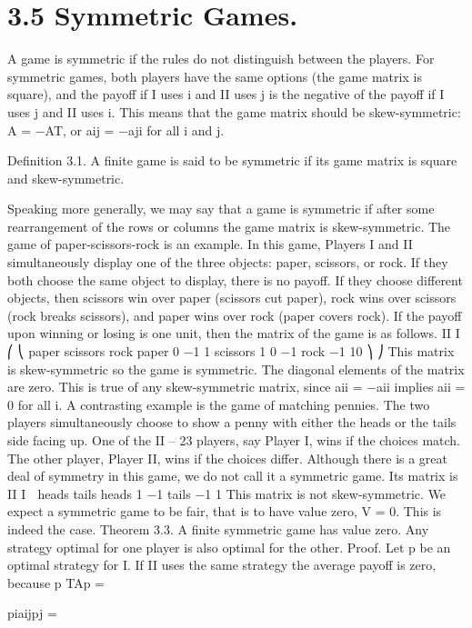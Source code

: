 \section{3.5 Symmetric Games.} A game is symmetric if the rules do not distinguish between
the players. For symmetric games, both players have the same options (the game matrix
is square), and the payoff if I uses i and II uses j is the negative of the payoff if I uses j
and II uses i. This means that the game matrix should be skew-symmetric: A = −AT,
or aij = −aji for all i and j.
\begin{framed}
Definition 3.1. A finite game is said to be symmetric if its game matrix is square and
skew-symmetric.
\end{framed}
Speaking more generally, we may say that a game is symmetric if after some rearrangement
of the rows or columns the game matrix is skew-symmetric.
The game of paper-scissors-rock is an example. In this game, Players I and II simultaneously
display one of the three objects: paper, scissors, or rock. If they both choose the
same object to display, there is no payoff. If they choose different objects, then scissors win
over paper (scissors cut paper), rock wins over scissors (rock breaks scissors), and paper
wins over rock (paper covers rock). If the payoff upon winning or losing is one unit, then
the matrix of the game is as follows.
II
I
⎛
⎝
paper scissors rock
paper 0 −1 1
scissors 1 0 −1
rock −1 10
⎞
⎠
This matrix is skew-symmetric so the game is symmetric. The diagonal elements of
the matrix are zero. This is true of any skew-symmetric matrix, since aii = −aii implies
aii = 0 for all i.
A contrasting example is the game of matching pennies. The two players simultaneously
choose to show a penny with either the heads or the tails side facing up. One of the
II – 23
players, say Player I, wins if the choices match. The other player, Player II, wins if the
choices differ. Although there is a great deal of symmetry in this game, we do not call it
a symmetric game. Its matrix is
II
I

heads tails
heads 1 −1
tails −1 1
This matrix is not skew-symmetric.
We expect a symmetric game to be fair, that is to have value zero, V = 0. This is
indeed the case.
Theorem 3.3. A finite symmetric game has value zero. Any strategy optimal for one
player is also optimal for the other.
Proof. Let p be an optimal strategy for I. If II uses the same strategy the average payoff
is zero, because
p
TAp = 

piaijpj = 

